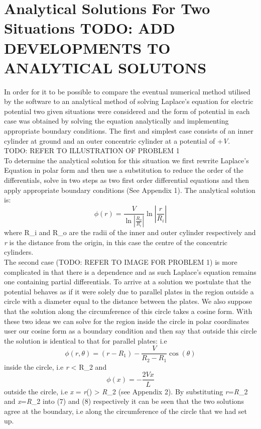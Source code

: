 \documentclass{article}
\begin{document}
\section{Analytical Solutions For Two Situations TODO: ADD DEVELOPMENTS TO ANALYTICAL SOLUTONS}
In order for it to be possible to compare the eventual numerical method utilised by the software to an analytical method of solving Laplace's equation for electric potential two given situations were considered and the form of potential in each case was obtained by solving the equation analytically and implementing appropriate boundary conditions. 
\newline The first and simplest case consists of an inner cylinder at ground and an outer concentric cylinder at a potential of +\textit{V}. \\
TODO: REFER TO ILLUSTRATION OF PROBLEM 1\\
To determine the analytical solution for this situation we first rewrite Laplace's Equation in polar form and then use a substitution to reduce the order of the differentials, solve in two steps as two first order differential equations and then apply appropriate boundary conditions (See Appendix 1).
The analytical solution is:
\begin{equation}
\phi(r)=\frac{V}{\ln\left|\frac{R_o}{R_i}\right|}\ln\left|\frac{r}{R_i}\right|
\label{29}
\end{equation}
where R_i\) and R_o\) are the radii of the inner and outer cylinder respectively and \textit{r} is the distance from the origin, in this case the centre of the concentric cylinders. \\
The second case (TODO: REFER TO IMAGE FOR PROBLEM 1) is more complicated in that there is a \theta\) dependence and as such Laplace's equation remains one containing partial differentials. To arrive at a solution we postulate that the potential behaves as if it were solely due to parallel plates in the region outside a circle with a diameter equal to the distance between the plates. We also suppose that the solution along the circumference of this circle takes a cosine form. With these two ideas we can solve for the region inside the circle in polar coordinates user our cosine form as a boundary condition and then say that outside this circle the solution is identical to that for parallel plates: i.e 
\begin{equation}
\phi(r,\theta)=(r-R_1)-\frac{V}{R_2-R_1}\cos(\theta)
\label{}
\end{equation}
inside the circle, i.e \textit{r} < R_2\) and
\begin{equation}
\phi(x)=-\frac{2Vx}{L}
\label{}
\end{equation}
outside the circle, i.e \textit{x} = \textit{r}\cos(\theta)\) > \textit{R}_2\) (see Appendix 2). By substituting \textit{r}=\textit{R}_2\) and \textit{x}=\textit{R}_2\cos\theta\) into (7) and (8) respectively it can be seen that the two solutions agree at the boundary, i.e along the circumference of the circle that we had set up.
\end{document}
